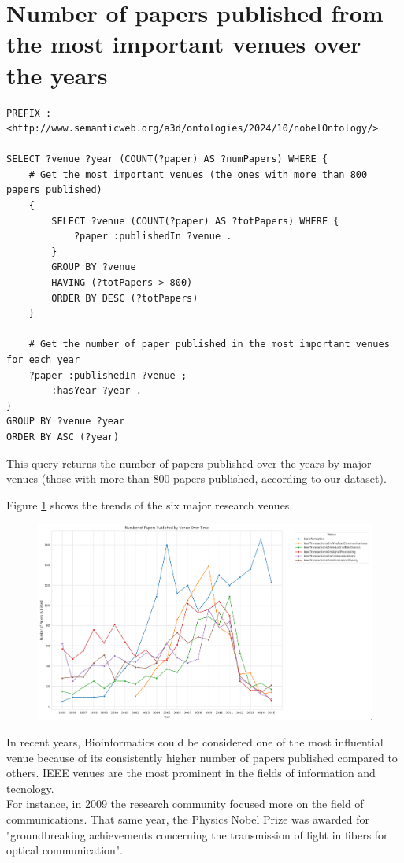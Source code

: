 \documentclass{article}
\begin{document}
\newpage

\section{Number of papers published from the most important venues over the years}

\begin{lstlisting}
PREFIX : <http://www.semanticweb.org/a3d/ontologies/2024/10/nobelOntology/>

SELECT ?venue ?year (COUNT(?paper) AS ?numPapers) WHERE {
    # Get the most important venues (the ones with more than 800 papers published)
    {
        SELECT ?venue (COUNT(?paper) AS ?totPapers) WHERE {
            ?paper :publishedIn ?venue .
        }
        GROUP BY ?venue
        HAVING (?totPapers > 800)
        ORDER BY DESC (?totPapers)
    }

    # Get the number of paper published in the most important venues for each year
    ?paper :publishedIn ?venue ;
        :hasYear ?year .
}
GROUP BY ?venue ?year
ORDER BY ASC (?year)
\end{lstlisting}

This query returns the number of papers published over the years by major
venues (those with more than 800 papers published, according to our dataset).

Figure \ref{fig:papersPerVenue} shows the trends of the six major research venues.

\begin{figure}[H]
	\centering
	\label{fig:papersPerVenue}
	\includegraphics[width=\textwidth]{../queries/plots/papersPerVenue.png}
\end{figure}

In recent years, Bioinformatics could be considered one of the most influential
venue because of its consistently higher number of papers published compared to others.
IEEE venues are the most prominent in the fields of information and tecnology.\\
For instance, in 2009 the research community focused more on the field of
communications.
That same year, the Physics Nobel Prize was awarded for "groundbreaking achievements
concerning the transmission of light in fibers for optical communication".
\end{document}
